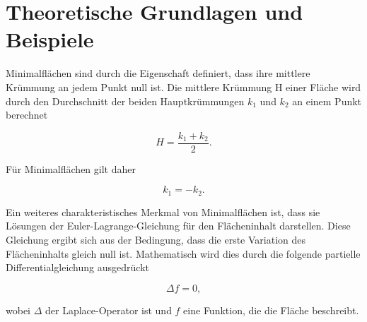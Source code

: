 %
%
%
%
\section{Theoretische Grundlagen und Beispiele
	\label{minimalflaechen:section:Theoretische Grundlagen und Beispiele}}
Minimalflächen sind durch die Eigenschaft definiert, dass ihre mittlere Krümmung an jedem Punkt null ist.
Die mittlere Krümmung H einer Fläche wird durch den Durchschnitt der beiden Hauptkrümmungen $k_1$ und $k_2$ an einem Punkt berechnet

\begin{equation}
	H=\frac{k_{1}+k_{2}}{2}.
\end{equation}

Für Minimalflächen gilt daher

\begin{equation}
	k_{1}=-k_{2}.
\end{equation}

Ein weiteres charakteristisches Merkmal von Minimalflächen ist, dass sie Lösungen der Euler-Lagrange-Gleichung für den Flächeninhalt darstellen.
Diese Gleichung ergibt sich aus der Bedingung, dass die erste Variation des Flächeninhalts gleich null ist.
Mathematisch wird dies durch die folgende partielle Differentialgleichung ausgedrückt

\begin{equation}
	\Delta f = 0,
\end{equation}

wobei $\Delta$ der Laplace-Operator ist und $f$ eine Funktion, die die Fläche beschreibt.

